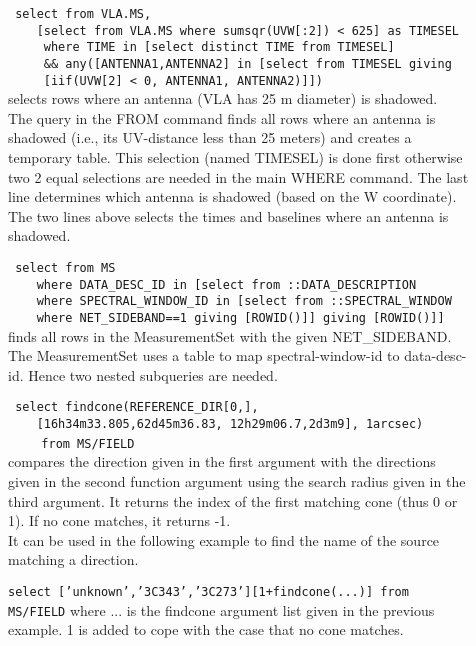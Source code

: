 \begin{description}
  \item[] \texttt{ select from VLA.MS,}
    \\\verb=    =
    \texttt{[select from VLA.MS where sumsqr(UVW[:2]) < 625] as TIMESEL}
    \\\verb=    =
    \texttt{ where TIME in [select distinct TIME from TIMESEL]}
    \\\verb=    =
    \texttt{   \&\& any([ANTENNA1,ANTENNA2] in [select from TIMESEL giving}
    \\\verb=    =
    \texttt{                      [iif(UVW[2] < 0, ANTENNA1, ANTENNA2)]])}
    \\selects rows where an antenna (VLA has 25 m diameter) is shadowed.
    \\The query in the FROM command finds all rows where an antenna
    is shadowed (i.e., its UV-distance less than 25 meters) and
    creates a temporary table. This selection (named TIMESEL) is done first
    otherwise two 2 equal selections
    are needed in the main WHERE command.
    The last line determines which antenna is shadowed (based on the
    W coordinate). The two lines above selects the times and
    baselines where an antenna is shadowed.
      
  \item[] \texttt{ select from MS}
     \\\verb=    =
      \texttt{where DATA\_DESC\_ID in [select from ::DATA\_DESCRIPTION}
     \\\verb=    =
      \texttt{where SPECTRAL\_WINDOW\_ID in [select from ::SPECTRAL\_WINDOW}
     \\\verb=    =
      \texttt{where NET\_SIDEBAND==1 giving [ROWID()]] giving [ROWID()]]}
      \\finds all rows in the MeasurementSet with the given
      NET\_SIDEBAND.
      \\The MeasurementSet uses a table to map spectral-window-id to
      data-desc-id. Hence two nested subqueries are needed.

    \item[] \texttt{ select findcone(REFERENCE\_DIR[0,],}
     \\\verb=    =
     \texttt{[16h34m33.805,62d45m36.83, 12h29m06.7,2d3m9], 1arcsec)}
     \\\verb=    =
     \texttt{from MS/FIELD}
     \\compares the direction given in the first argument with the
     directions given in the second function argument using the search
     radius given in the third argument. It returns the index of the
     first matching cone (thus 0 or 1). If no cone matches, it returns -1.
     \\It can be used in the following example to find the name of the
     source matching a direction.

     \item[] \texttt{select ['unknown','3C343','3C273'][1+findcone(...)] from MS/FIELD}
       where ... is the findcone argument list given in the previous
       example. 1 is added to cope with the case that no cone matches.
\end{description}

